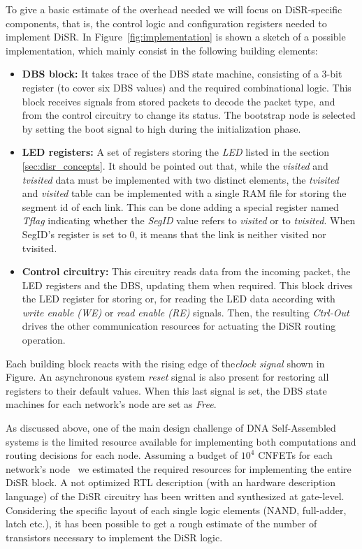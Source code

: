 To give a basic estimate of the overhead needed we will focus on
DiSR-specific components, that is, the control logic and configuration
registers needed to implement DiSR. In
Figure~\ref{fig:implementation} is shown a sketch of a possible
implementation, which mainly consist in the following building
elements: 
\begin{itemize}
	\item \textbf{DBS block:} It takes trace of the DBS state machine, 
	consisting of a 3-bit register (to cover six DBS values) and the 
	required combinational logic. This block receives signals from 
	stored packets to decode the packet type, and from 
	the control circuitry to change its status.
	The bootstrap node is selected by setting the boot signal to high
	during the initialization phase.  
	\item \textbf{LED registers:} A set of registers storing 
	the \emph{LED} listed in the section
	\ref{sec:disr_concepts}. It should be pointed out that, while the \emph{visited} 
	and \emph{tvisited} data must be implemented with two distinct
	elements, the \emph{tvisited} and \emph{visited} table can be implemented with 
	a single RAM file for storing the segment id of each link.
	This can be done adding a special register named \emph{Tflag}
	indicating whether the \emph{SegID} value refers to \emph{visited} or to 
	\emph{tvisited}. When SegID's register is set to 0, it means that the link
	is neither visited nor tvisited.

    \item \textbf{Control circuitry:} This circuitry reads data from
	the incoming packet, the LED registers and the DBS,
	updating them when required. This block drives the LED register 
	for storing or, for reading the LED data according with
	\emph{write enable (WE)} or \emph{read enable (RE)}
	signals. Then, the resulting \emph{Ctrl-Out} drives the other
	communication resources for actuating the DiSR routing operation.
\end{itemize}

Each building block reacts with the rising edge  of
the\emph{clock signal} shown in Figure. An asynchronous system
\emph{reset} signal is also present for restoring all registers to
their default values. When this last signal is
set, the DBS state machines for each network's node are set as
\emph{Free}. 

As discussed above, one of the main design challenge of DNA
Self-Assembled systems is the limited resource available for
implementing both computations and routing decisions for each node.
Assuming a budget of $10^4$ CNFETs for each network's
node~\cite{liu_jetcs}  we estimated the required resources for
implementing the entire DiSR block.  A not optimized RTL description
(with an hardware description language)  of the DiSR circuitry has
been written and synthesized at gate-level. Considering the specific
layout of each single logic elements (NAND, full-adder, latch etc.),
it has been possible to get a rough estimate of the number of
transistors necessary to implement the DiSR logic.

